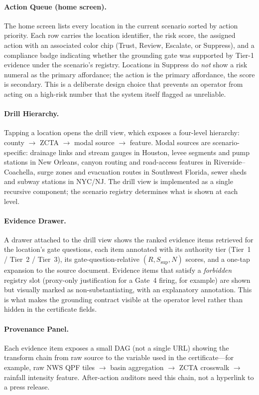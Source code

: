 \documentclass[sigconf,nonacm=true,review,authoryear]{acmart}
\begin{document}
\paragraph{Action Queue (home screen).}
The home screen lists every location in the current scenario sorted
by action priority. Each row carries the location identifier, the
risk score, the assigned action with an associated color chip
(Trust, Review, Escalate, or Suppress), and a compliance badge
indicating whether the grounding gate was supported by Tier-1
evidence under the scenario's registry. Locations in Suppress do
\emph{not} show a risk numeral as the primary affordance; the action
is the primary affordance, the score is secondary. This is a
deliberate design choice that prevents an operator from acting on a
high-risk number that the system itself flagged as unreliable.

\paragraph{Drill Hierarchy.}
Tapping a location opens the drill view, which exposes a four-level
hierarchy: county $\to$ ZCTA $\to$ modal source $\to$ feature. Modal
sources are scenario-specific:
drainage links and stream gauges in Houston, levee segments and pump
stations in New Orleans, canyon routing and road-access features in
Riverside--Coachella, surge zones and evacuation routes in Southwest
Florida, sewer sheds and subway stations in NYC/NJ. The drill view
is implemented as a single recursive component; the scenario
registry determines what is shown at each level.

\paragraph{Evidence Drawer.}
A drawer attached to the drill view shows the ranked evidence items
retrieved for the location's gate questions, each item annotated with
its authority tier (Tier~1 / Tier~2 / Tier~3), its
gate-question-relative $(R, S_{\text{sup}}, N)$ scores, and a one-tap
expansion to the source document. Evidence items that satisfy a
\emph{forbidden} registry slot (proxy-only justification for a Gate~4
firing, for example) are shown but visually marked as
non-substantiating, with an explanatory annotation. This is what
makes the grounding contract visible at the operator level rather
than hidden in the certificate fields.

\paragraph{Provenance Panel.}
Each evidence item exposes a small DAG (not a single URL) showing the
transform chain from raw source to the variable used in the
certificate---for example, raw NWS QPF tiles $\rightarrow$ basin
aggregation $\rightarrow$ ZCTA crosswalk $\rightarrow$ rainfall
intensity feature. After-action auditors need this chain, not a
hyperlink to a press release.
\end{document}
